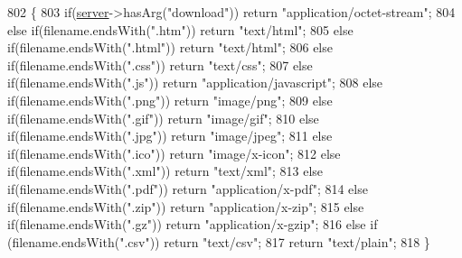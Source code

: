 \begin{DoxyCode}
802                                                  \{
803   \textcolor{keywordflow}{if}(\hyperlink{class_wi_fi_manager_a509523a01c0395cf0dc235b074f2a5ea}{server}->hasArg(\textcolor{stringliteral}{"download"})) \textcolor{keywordflow}{return} \textcolor{stringliteral}{"application/octet-stream"};
804   \textcolor{keywordflow}{else} \textcolor{keywordflow}{if}(filename.endsWith(\textcolor{stringliteral}{".htm"})) \textcolor{keywordflow}{return} \textcolor{stringliteral}{"text/html"};
805   \textcolor{keywordflow}{else} \textcolor{keywordflow}{if}(filename.endsWith(\textcolor{stringliteral}{".html"})) \textcolor{keywordflow}{return} \textcolor{stringliteral}{"text/html"};
806   \textcolor{keywordflow}{else} \textcolor{keywordflow}{if}(filename.endsWith(\textcolor{stringliteral}{".css"})) \textcolor{keywordflow}{return} \textcolor{stringliteral}{"text/css"};
807   \textcolor{keywordflow}{else} \textcolor{keywordflow}{if}(filename.endsWith(\textcolor{stringliteral}{".js"})) \textcolor{keywordflow}{return} \textcolor{stringliteral}{"application/javascript"};
808   \textcolor{keywordflow}{else} \textcolor{keywordflow}{if}(filename.endsWith(\textcolor{stringliteral}{".png"})) \textcolor{keywordflow}{return} \textcolor{stringliteral}{"image/png"};
809   \textcolor{keywordflow}{else} \textcolor{keywordflow}{if}(filename.endsWith(\textcolor{stringliteral}{".gif"})) \textcolor{keywordflow}{return} \textcolor{stringliteral}{"image/gif"};
810   \textcolor{keywordflow}{else} \textcolor{keywordflow}{if}(filename.endsWith(\textcolor{stringliteral}{".jpg"})) \textcolor{keywordflow}{return} \textcolor{stringliteral}{"image/jpeg"};
811   \textcolor{keywordflow}{else} \textcolor{keywordflow}{if}(filename.endsWith(\textcolor{stringliteral}{".ico"})) \textcolor{keywordflow}{return} \textcolor{stringliteral}{"image/x-icon"};
812   \textcolor{keywordflow}{else} \textcolor{keywordflow}{if}(filename.endsWith(\textcolor{stringliteral}{".xml"})) \textcolor{keywordflow}{return} \textcolor{stringliteral}{"text/xml"};
813   \textcolor{keywordflow}{else} \textcolor{keywordflow}{if}(filename.endsWith(\textcolor{stringliteral}{".pdf"})) \textcolor{keywordflow}{return} \textcolor{stringliteral}{"application/x-pdf"};
814   \textcolor{keywordflow}{else} \textcolor{keywordflow}{if}(filename.endsWith(\textcolor{stringliteral}{".zip"})) \textcolor{keywordflow}{return} \textcolor{stringliteral}{"application/x-zip"};
815   \textcolor{keywordflow}{else} \textcolor{keywordflow}{if}(filename.endsWith(\textcolor{stringliteral}{".gz"})) \textcolor{keywordflow}{return} \textcolor{stringliteral}{"application/x-gzip"};
816   \textcolor{keywordflow}{else} \textcolor{keywordflow}{if} (filename.endsWith(\textcolor{stringliteral}{".csv"})) \textcolor{keywordflow}{return} \textcolor{stringliteral}{"text/csv"};
817   \textcolor{keywordflow}{return} \textcolor{stringliteral}{"text/plain"};
818 \}
\end{DoxyCode}
